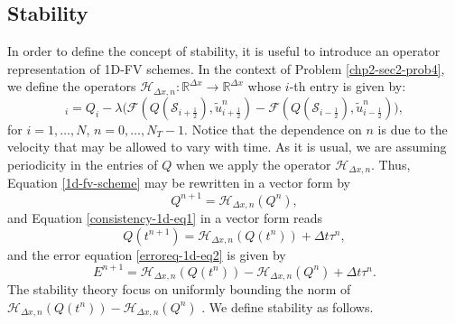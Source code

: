 \subsection{Stability}
\label{chp2-sub-stability}
In order to define the concept of stability, it is useful to introduce an operator
representation of 1D-FV schemes.
In the context of Problem \ref{chp2-sec2-prob4}, we define the operators
$\mathcal{H}_{\Delta x,n}: \mathbb{R}^{\Delta x} \to \mathbb{R}^{\Delta x}$ whose $i$-th entry is given by:
\begin{equation}
	[\mathcal{H}_{\Delta x,n}(Q)]_i = Q_i -
	\lambda \bigg( \mathcal{F}(Q(\mathcal{S}_{i+\frac{1}{2}} ),\tilde{u}^n_{i+\frac{1}{2}}) 
	- \mathcal{F}(Q(\mathcal{S}_{i-\frac{1}{2}} ),\tilde{u}^n_{i-\frac{1}{2}}) \bigg),
\end{equation}
for $i=1, \ldots, N$, $n=0, \ldots, N_T-1$.
Notice that the dependence on $n$ is due to the velocity that may be allowed
to vary with time.
As it is usual, we are assuming periodicity in the entries of $Q$ when 
we apply the operator $\mathcal{H}_{\Delta x,n}$.
Thus, Equation \eqref{1d-fv-scheme} may be rewritten in a vector form by
\begin{equation*}
	Q^{n+1} = \mathcal{H}_{\Delta x,n}(Q^n),
\end{equation*}
and Equation \eqref{consistency-1d-eq1} in a vector form reads
\begin{equation*}
	Q(t^{n+1}) = \mathcal{H}_{\Delta x,n}(Q(t^n)) + \Delta t \tau^n,
\end{equation*}
and the error equation \eqref{erroreq-1d-eq2} is given by
\begin{equation}
	\label{erroreq-1d-eq3}
	E^{n+1} = \mathcal{H}_{\Delta x,n}(Q(t^n)) - \mathcal{H}_{\Delta x,n}(Q^n) +  \Delta t \tau^n.
\end{equation}
The stability theory focus on uniformly bounding the norm of $\mathcal{H}_{\Delta x,n}(Q(t^n)) - \mathcal{H}_{\Delta x,n}(Q^n)$ \citep{leveque:2002}.
We define stability as follows.

